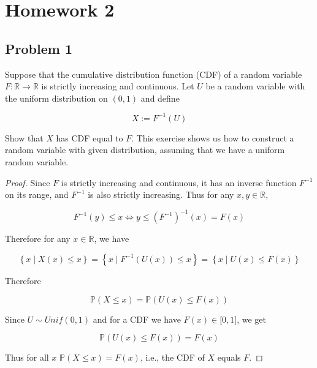 \chapter{Homework 2}\label{homework-2}

\section{Problem 1}\label{hw02-problem-1}

Suppose that the cumulative distribution function (CDF) of a random variable \(\mathit{F}:\mathbb{R}\rightarrow\mathbb{R}\) is strictly increasing and continuous. Let \(\mathit{U}\) be a random variable with the uniform distribution on \((0,1)\) and define

\[\mathit{X} := \mathit{F}^{- 1}(\mathit{U})\]

Show that \(\mathit{X}\) has CDF equal to \(\mathit{F}\). This exercise shows us how to construct a random variable with given distribution, assuming that we have a uniform random variable.

\begin{proof}

Since \(\mathit{F}\) is strictly increasing and continuous, it has an inverse function \(\mathit{F}^{- 1}\) on its range, and \(\mathit{F}^{- 1}\) is also strictly increasing. Thus for any \(\mathit{x},\mathit{y} \in \mathbb{R}\),

\[\mathit{F}^{- 1}(\mathit{y}) \leq \mathit{x}\Leftrightarrow\mathit{y} \leq (\mathit{F}^{- 1})^{- 1}(\mathit{x}) = \mathit{F}(\mathit{x})\]

Therefore for any \(\mathit{x} \in \mathbb{R}\), we have

\[\left\{ {\mathit{x} \mid \mathit{X}(\mathit{x}) \leq \mathit{x}} \right\} = \left\{ {\mathit{x} \mid \mathit{F}^{- 1}(\mathit{U}(\mathit{x})) \leq \mathit{x}} \right\} = \left\{ {\mathit{x} \mid \mathit{U}(\mathit{x}) \leq \mathit{F}(\mathit{x})} \right\}\]

Therefore

\[\mathbb{P}(\mathit{X} \leq \mathit{x}) = \mathbb{P}(\mathit{U}(\mathit{x}) \leq \mathit{F}(\mathit{x}))\]

Since \(\mathit{U} \sim Unif(0,1)\) and for a CDF we have \(\mathit{F}(\mathit{x}) \in \lbrack 0,1\rbrack\), we get

\[\mathbb{P}(\mathit{U}(\mathit{x}) \leq \mathit{F}(\mathit{x})) = \mathit{F}(\mathit{x})\]

Thus for all \(\mathit{x}\) \(\mathbb{P}(\mathit{X} \leq \mathit{x}) = \mathit{F}(\mathit{x})\), i.e., the CDF of \(\mathit{X}\) equals \(\mathit{F}\).

\end{proof}

